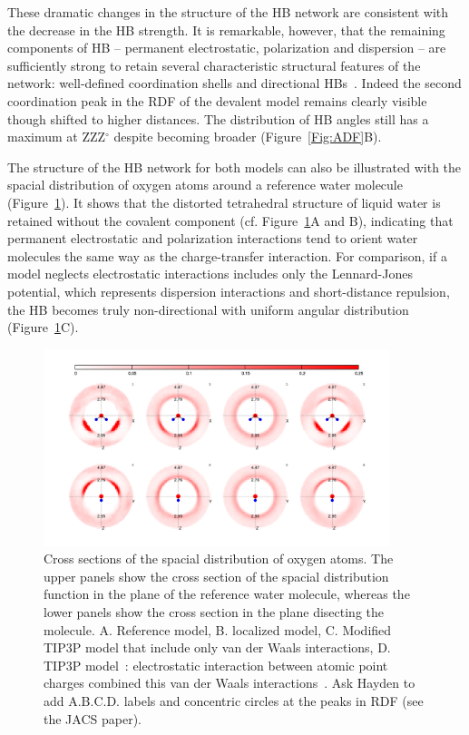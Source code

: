 \documentclass[prl,twocolumn,showpacs]{revtex4}
\begin{document}
These dramatic changes in the structure of the HB network are consistent with the decrease in the HB strength. It is remarkable, however, that the remaining components of HB -- permanent electrostatic, polarization and dispersion -- are sufficiently strong to retain several characteristic structural features of the network: well-defined coordination shells and directional HBs~\cite{below}.
%
%
Indeed the second coordination peak in the RDF of the devalent model remains clearly visible though shifted to higher distances. The distribution of HB angles still has a maximum at ZZZ$^\circ$ despite becoming broader (Figure~\ref{Fig:ADF}B). 

The structure of the HB network for both models can also be illustrated with the spacial distribution of oxygen atoms around a reference water molecule (Figure~\ref{Fig:SDF}). It shows that the distorted tetrahedral structure of liquid water is retained without the covalent component (cf. Figure~\ref{Fig:SDF}A and B), indicating that permanent electrostatic and polarization interactions tend to orient water molecules the same way as the charge-transfer interaction. For comparison, if a model neglects electrostatic interactions includes only the Lennard-Jones potential, which represents dispersion interactions and short-distance repulsion, the HB becomes truly non-directional with uniform angular distribution (Figure~\ref{Fig:SDF}C). 

\begin{figure}
\includegraphics[width=0.9\textwidth]{SDF}
\caption{Cross sections of the spacial distribution of oxygen atoms. The upper panels show the cross section of the spacial distribution function in the plane of the reference water molecule, whereas the lower panels show the cross section in the plane disecting the molecule. A. Reference model, B. localized model, C. Modified TIP3P model that include only van der Waals interactions, D. TIP3P model~\cite{TIP3P}: electrostatic interaction between atomic point charges combined this van der Waals interactions~\cite{TIP3P}. \new Ask Hayden to add A.B.C.D. labels and concentric circles at the peaks in RDF (see the JACS paper).\old} \label{Fig:SDF}
\end{figure}
\end{document}
